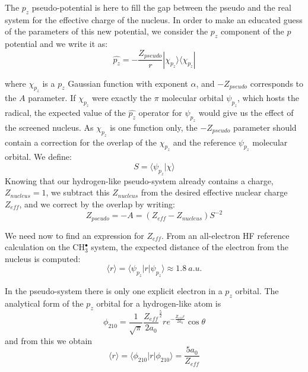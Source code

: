 \documentclass[aip]{revtex4-1}
\begin{document}
The  \(p_{z}\) pseudo-potential is here to fill the gap between the pseudo and the real system 
for the effective charge of the nucleus. 
In order to make an educated guess of the parameters of this new potential, we 
consider  the $p_z$ component of the $p$ potential and we write it as:
\begin{equation}
\widehat{p_z} = -\frac{Z_{pseudo}}{r} | \chi_{p_z} \rangle \langle \chi_{p_z} |
\end{equation}

where $\chi_{p_z}$ is a $p_z$ Gaussian function with exponent $\alpha$,
and $-{Z_{pseudo}}$ corresponds to the $A$ parameter. 
If $\chi_{p_z}$ were exactly the $\pi$ molecular orbital \(\psi_{p_{z}}\), which hosts the
radical, the expected value of the $\widehat{p_z}$ operator for \(\psi_{p_{z}}\) would
give us the effect of the screened nucleus. 
As $\chi_{p_z}$ is one function only, 
the $-{Z_{pseudo}}$ parameter should contain a
correction for the overlap of the $\chi_{p_z}$ and the reference \(\psi_{p_{z}}\) 
molecular orbital. We define:
\begin{equation}
S = \langle \psi_{p_{z}} | \chi \rangle
\end{equation}
Knowing that our hydrogen-like pseudo-system already contains a charge, \(Z_{nucleus}=1\), 
we subtract this \(Z_{nucleus}\)  from the desired effective nuclear charge \(Z_{eff}\),
and we correct by the overlap by writing: 
\begin{equation}
\label{eq:Zeff}
Z_{pseudo} = -A = (Z_{eff} - Z_{nucleus})S^{-2}
\end{equation}

We need now to find an expression for \(Z_{eff}\). From an all-electron HF
reference calculation on the CH\(^{\bullet}_{3}\) system, the expected 
distance of the electron from the nucleus is computed: 
\begin{equation}
\langle r \rangle = \langle \psi_{p_{z}} | r | \psi_{p_{z}} \rangle \approx 1.8 \ a.u.
\label{equation:exp_r}
\end{equation}

In the pseudo-system there is only one explicit electron in a $p_z$ orbital. 
The analytical form of the \(p_{z}\) orbital for a hydrogen-like atom is\cite{me_structure_theory}
\begin{equation}
\phi_{210} = \frac{1}{\sqrt{\pi}} \frac{Z_{eff}}{2a_{0}} ^{\frac{5}{2}} re^{-\frac{Z_{eff}r}{2a_{0}}} \cos \theta
\end{equation}
and from this we obtain 
\begin{equation}
\label{equation:PsirPsi}
\langle r \rangle = \langle \phi_{210} | r | \phi_{210} \rangle = \frac{5a_{0}}{Z_{eff}}
\end{equation}
\end{document}
